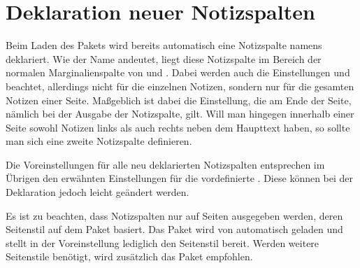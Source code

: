 
\section{Deklaration neuer Notizspalten}

Beim Laden des Pakets wird bereits automatisch eine Notizspalte namens
 deklariert. Wie der Name andeutet, liegt diese Notizspalte
im Bereich der normalen Marginalienspalte von 
und . Dabei werden auch die Einstellungen
 und  beachtet, allerdings
nicht für die einzelnen Notizen, sondern nur für die gesamten Notizen einer
Seite. Maßgeblich ist dabei die Einstellung, die am Ende der Seite, nämlich
bei der Ausgabe der Notizspalte, gilt. Will man hingegen innerhalb einer Seite
sowohl Notizen links als auch rechts neben dem Haupttext haben, so sollte man
sich eine zweite Notizspalte definieren.

Die Voreinstellungen für alle neu deklarierten Notizspalten entsprechen im
Übrigen \iffree{}{\pagebreak}%
den erwähnten Einstellungen für die vordefinierte
. %
\iftrue%
Diese können bei der Deklaration jedoch leicht geändert werden.%
\fi

Es ist zu beachten, dass Notizspalten nur auf Seiten
ausgegeben werden, deren Seitenstil auf dem Paket
\hyperref[cha:scrlayer]{}%
 basiert. Das Paket
\hyperref[cha:scrlayer]{} wird von
 automatisch geladen und stellt in der
Voreinstellung lediglich den Seitenstil
 bereit. Werden weitere Seitenstile
benötigt, wird zusätzlich das Paket
\hyperref[cha:scrlayer-scrpage]{}%
%
empfohlen.

